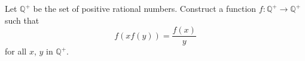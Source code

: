 Let $ {\mathbb Q}^ +$ be the set of positive rational numbers.
Construct a function $ f : {\mathbb Q}^+ \rightarrow {\mathbb Q}^+$ such that
\[ f(xf(y)) = \frac {f(x)}{y} \]
for all $ x$,  $ y$ in $ {\mathbb Q}^ +$.
